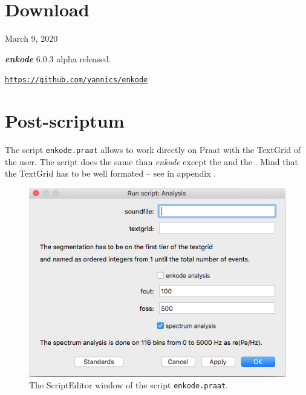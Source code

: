 \section{Download}

March 9, 2020

\textsl{\textbf{enkode}} 6.0.3 alpha released.

\href{https://github.com/yannics/enkode}{\texttt{\small https://github.com/yannics/enkode}} 

%


\section{Post-scriptum}

The script \texttt{enkode.praat} allows to work directly on Praat with the TextGrid of the user. The script does the same than \textsl{enkode} except the \textsl{} and the \textsl{}. Mind that the TextGrid has to be well formated -- see  in appendix .

\smallskip

\makeatletter
\setlength{\@fptop}{0pt}
\makeatother

\begin{figure}[!hbt]
	\begin{center}
		\includegraphics[scale=0.5]{img/5611}
		\caption{The ScriptEditor window of the script \texttt{enkode.praat}.}
		\label{fig:praat}
	\end{center}
\end{figure}